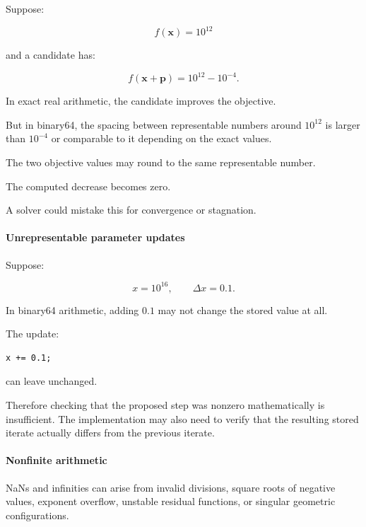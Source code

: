 \hypertarget{02-foundations-ii-ch027-catastrophic-cancellation}{}

Suppose:

\[
f(\mathbf x)=10^{12}
\]

and a candidate has:

\[
f(\mathbf x+\mathbf p)=10^{12}-10^{-4}.
\]

In exact real arithmetic, the candidate improves the objective.

But in binary64, the spacing between representable numbers around \(10^{12}\) is larger than \(10^{-4}\) or comparable to it depending on the exact values.

The two objective values may round to the same representable number.

The computed decrease becomes zero.

A solver could mistake this for convergence or stagnation.

\paragraph{Unrepresentable parameter updates}\label{02-foundations-ii-ch027-unrepresentable-parameter-updates}

\hypertarget{02-foundations-ii-ch027-unrepresentable-parameter-updates}{}

Suppose:

\[
x=10^{16}, \qquad \Delta x=0.1.
\]

In binary64 arithmetic, adding \(0.1\) may not change the stored value at all.

The update:

\begin{verbatim}
x += 0.1;
\end{verbatim}

can leave  unchanged.

Therefore checking that the proposed step was nonzero mathematically is insufficient. The implementation may also need to verify that the resulting stored iterate actually differs from the previous iterate.

\paragraph{Nonfinite arithmetic}\label{02-foundations-ii-ch027-nonfinite-arithmetic}

\hypertarget{02-foundations-ii-ch027-nonfinite-arithmetic}{}

NaNs and infinities can arise from invalid divisions, square roots of negative values, exponent overflow, unstable residual functions, or singular geometric configurations.

